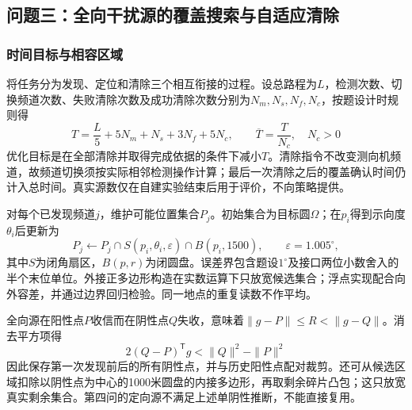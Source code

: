 \subsection{问题三：全向干扰源的覆盖搜索与自适应清除}
\label{sub:model-p3}

\subsubsection{时间目标与相容区域}
将任务分为发现、定位和清除三个相互衔接的过程。设总路程为$L$，检测次数、切换频道次数、失败清除次数及成功清除次数分别为$N_m,N_s,N_f,N_c$，按题设计时规则得
\begin{equation}
 T=\frac{L}{5}+5N_m+N_s+3N_f+5N_c,
 \qquad \overline T=\frac{T}{N_c},\quad N_c>0
 \label{eq:search-time}
\end{equation}
优化目标是在全部清除并取得完成依据的条件下减小$T$。清除指令不改变测向机频道，故频道切换须按实际相邻检测操作计算；最后一次清除之后的覆盖确认时间仍计入总时间。真实源数仅在自建实验结束后用于评价，不向策略提供。

对每个已发现频道$j$，维护可能位置集合$P_j$。初始集合为目标圆$\Omega$；在$p_i$得到示向度$\theta_i$后更新为
\begin{equation}
 P_j\leftarrow P_j\cap S(p_i,\theta_i,\varepsilon)
          \cap B(p_i,1500),\qquad \varepsilon=1.005^\circ,
 \label{eq:search-region}
\end{equation}
其中$S$为闭角扇区，$B(p,r)$为闭圆盘。误差界包含题设$1^\circ$及接口两位小数舍入的半个末位单位。外接正多边形构造在实数运算下只放宽候选集合；浮点实现配合向外容差，并通过边界回归检验。同一地点的重复读数不作平均。

全向源在阳性点$P$收信而在阴性点$Q$失收，意味着$\|g-P\|\le R<\|g-Q\|$。消去平方项得
\begin{equation}
 2(Q-P)^{\mathsf T}g<\|Q\|^2-\|P\|^2
 \label{eq:omni-negative}
\end{equation}
因此保存第一次发现前后的所有阴性点，并与历史阳性点配对裁剪。还可从候选区域扣除以阴性点为中心的1000米圆盘的内接多边形，再取剩余碎片凸包；这只放宽真实剩余集合。第四问的定向源不满足上述单阴性推断，不能直接复用。

